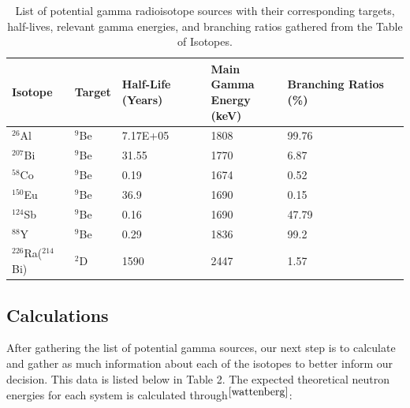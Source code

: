 \documentclass[%
12pt,
twoside,
reprint,
amsmath,amssymb,
aps,
]{article}
\begin{document}
	\begin{table}
		\begin{center}
		\scriptsize
		\begin{tabular}{l l l l l l}
			\hline
			\textbf{Isotope} & \textbf{Target} & \textbf{Half-Life (Years)} & \makecell{\textbf{Main Gamma} \\ \textbf{Energy (keV)}} & \textbf{Branching Ratios (\%)} \\ \hline
			$^{26}$Al            & $^{9}$Be           & 7.17E+05                   & 1808                             & 99.76                          \\ \hline
			$^{207}$Bi           & $^{9}$Be          & 31.55                      & 1770                             & 6.87                           \\ \hline
			$^{58}$Co            & $^{9}$Be            & 0.19                       & 1674                             & 0.52                           \\ \hline
			$^{150}$Eu           & $^{9}$Be           & 36.9                       & 1690                             & 0.15                           \\ \hline
			$^{124}$Sb           & $^{9}$Be           & 0.16                       & 1690                             & 47.79                          \\ \hline
			$^{88}$Y             & $^{9}$Be            & 0.29                       & 1836                             & 99.2                           \\ \hline
			$^{226}$Ra($^{214}$Bi)       & $^{2}$D              & 1590                       & 2447                             & 1.57                           \\ \hline
		\end{tabular}
		\caption{\label{tab:table-name} List of potential gamma radioisotope sources with their corresponding targets, half-lives, relevant gamma energies, and branching ratios gathered from the Table of Isotopes.}
	\end{center}
	\end{table}
		
	\subsection{Calculations}
	\par After gathering the list of potential gamma sources, our next step is to calculate and gather as much information about each of the isotopes to better inform our decision. This data is listed below in Table 2. The expected theoretical neutron energies for each system is calculated through$^{\cite{wattenberg}}$:
	
\end{document}
